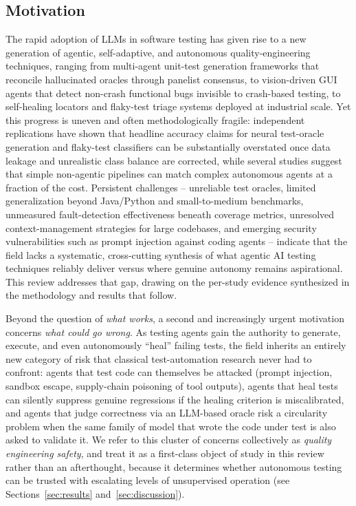 \subsection{Motivation}
The rapid adoption of LLMs in software testing has given rise to a new
generation of agentic, self-adaptive, and autonomous quality-engineering
techniques, ranging from multi-agent unit-test generation frameworks
that reconcile hallucinated oracles through panelist consensus, to
vision-driven GUI agents that detect non-crash functional bugs
invisible to crash-based testing, to self-healing locators and
flaky-test triage systems deployed at industrial scale. Yet this
progress is uneven and often methodologically fragile: independent
replications have shown that headline accuracy claims for neural
test-oracle generation and flaky-test classifiers can be substantially
overstated once data leakage and unrealistic class balance are
corrected, while several studies suggest that simple non-agentic
pipelines can match complex autonomous agents at a fraction of the
cost. Persistent challenges -- unreliable test oracles, limited
generalization beyond Java/Python and small-to-medium benchmarks,
unmeasured fault-detection effectiveness beneath coverage metrics,
unresolved context-management strategies for large codebases, and
emerging security vulnerabilities such as prompt injection against
coding agents -- indicate that the field lacks a systematic,
cross-cutting synthesis of what agentic AI testing techniques reliably
deliver versus where genuine autonomy remains aspirational. This
review addresses that gap, drawing on the per-study evidence
synthesized in the methodology and results that follow.

Beyond the question of \emph{what works}, a second and increasingly
urgent motivation concerns \emph{what could go wrong}. As testing
agents gain the authority to generate, execute, and even autonomously
``heal'' failing tests, the field inherits an entirely new category of
risk that classical test-automation research never had to confront:
agents that test code can themselves be attacked (prompt injection,
sandbox escape, supply-chain poisoning of tool outputs), agents that
heal tests can silently suppress genuine regressions if the healing
criterion is miscalibrated, and agents that judge correctness via an
LLM-based oracle risk a circularity problem when the same family of
model that wrote the code under test is also asked to validate it. We
refer to this cluster of concerns collectively as \emph{quality
engineering safety}, and treat it as a first-class object of study in
this review rather than an afterthought, because it determines whether
autonomous testing can be trusted with escalating levels of
unsupervised operation (see Sections~\ref{sec:results}
and~\ref{sec:discussion}).

